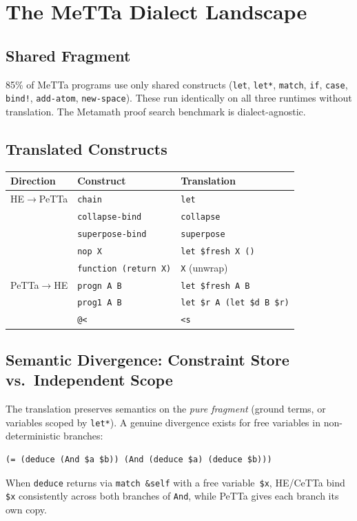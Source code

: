 \documentclass[11pt]{article}
\newcommand{\code}[1]{\texttt{#1}}
\newcommand{\PeTTa}{\textup{PeTTa}}
\newcommand{\HE}{\textup{HE}}
\newcommand{\CeTTa}{\textup{CeTTa}}
\begin{document}
\section{The MeTTa Dialect Landscape}

\subsection{Shared Fragment}

85\% of MeTTa programs use only shared constructs (\code{let},
\code{let*}, \code{match}, \code{if}, \code{case}, \code{bind!},
\code{add-atom}, \code{new-space}).  These run identically on all three
runtimes without translation.  The Metamath proof search benchmark is
dialect-agnostic.

\subsection{Translated Constructs}

\begin{center}
\begin{tabular}{lll}
\toprule
Direction & Construct & Translation \\
\midrule
\HE{}$\to$\PeTTa{} & \code{chain} & \code{let} \\
& \code{collapse-bind} & \code{collapse} \\
& \code{superpose-bind} & \code{superpose} \\
& \code{nop X} & \code{let \$fresh X ()} \\
& \code{function (return X)} & \code{X} (unwrap) \\
\PeTTa{}$\to$\HE{} & \code{progn A B} & \code{let \$fresh A B} \\
& \code{prog1 A B} & \code{let \$r A (let \$d B \$r)} \\
& \code{@<} & \code{<s} \\
\bottomrule
\end{tabular}
\end{center}

\subsection{Semantic Divergence: Constraint Store vs.\ Independent Scope}

The translation preserves semantics on the \emph{pure fragment}
(ground terms, or variables scoped by \code{let*}).  A genuine
divergence exists for free variables in non-deterministic branches:
\begin{lstlisting}[language={},basicstyle=\ttfamily\scriptsize]
(= (deduce (And $a $b)) (And (deduce $a) (deduce $b)))
\end{lstlisting}
When \code{deduce} returns via \code{match \&self} with a free
variable~\code{\$x}, \HE{}/\CeTTa{} bind \code{\$x} consistently
across both branches of \code{And}, while \PeTTa{} gives each branch
its own copy.
\end{document}
